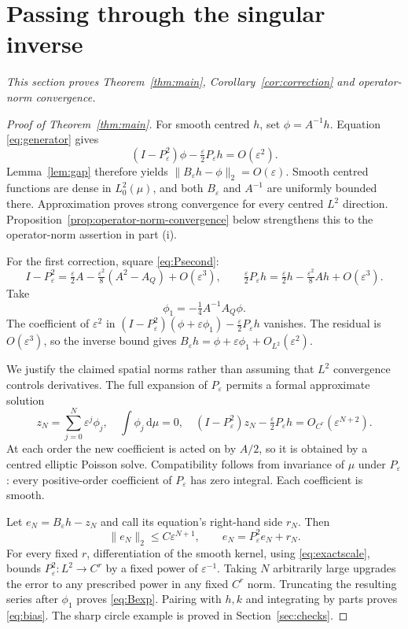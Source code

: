 \documentclass[11pt,a4paper]{article}
\theoremstyle{definition}\newtheorem{definition}[theorem]{Definition}
\theoremstyle{remark}\newtheorem{remark}[theorem]{Remark}
\newcommand{\eps}{\varepsilon}
\newcommand{\dd}{\,\mathrm d}
\newcommand{\norm}[1]{\lVert #1\rVert}
\begin{document}
\section{Passing through the singular inverse}\label{sec:inverse}

\noindent\emph{This section proves Theorem~\ref{thm:main}, Corollary~\ref{cor:correction} and operator-norm convergence.}

\begin{proof}[Proof of Theorem~\ref{thm:main}]
For smooth centred $h$, set $\phi=A^{-1}h$. Equation \eqref{eq:generator} gives
\[
(I-P_\eps^2)\phi-\tfrac\eps2P_\eps h=O(\eps^2).
\]
Lemma~\ref{lem:gap} therefore yields $\norm{B_\eps h-\phi}_2=O(\eps)$.
Smooth centred functions are dense in $L^2_0(\mu)$, and both $B_\eps$ and $A^{-1}$ are uniformly bounded there. Approximation proves strong convergence for every centred $L^2$ direction. Proposition~\ref{prop:operator-norm-convergence} below strengthens this to the operator-norm assertion in part (i).

For the first correction, square \eqref{eq:Psecond}:
\[
I-P_\eps^2=\tfrac\eps2A-\tfrac{\eps^2}{8}(A^2-A_Q)+O(\eps^3),
\qquad \tfrac\eps2P_\eps h=\tfrac\eps2h-\tfrac{\eps^2}{8}Ah+O(\eps^3).
\]
Take
\[
\phi_1=-\tfrac14A^{-1}A_Q\phi.
\]
The coefficient of $\eps^2$ in
$(I-P_\eps^2)(\phi+\eps\phi_1)-\tfrac\eps2P_\eps h$
vanishes. The residual is $O(\eps^3)$, so the inverse bound gives
$B_\eps h=\phi+\eps\phi_1+O_{L^2}(\eps^2)$.

We justify the claimed spatial norms rather than assuming that $L^2$ convergence controls derivatives. The full expansion of $P_\eps$ permits a formal approximate solution
\[
z_N=\sum_{j=0}^{N}\eps^j\phi_j,
\quad \int\phi_j\dd\mu=0,
\quad (I-P_\eps^2)z_N-\tfrac\eps2P_\eps h=O_{C^r}(\eps^{N+2}).
\]
At each order the new coefficient is acted on by $A/2$, so it is obtained by a centred elliptic Poisson solve. Compatibility follows from invariance of $\mu$ under $P_\eps$: every positive-order coefficient of $P_\eps$ has zero integral. Each coefficient is smooth.

Let $e_N=B_\eps h-z_N$ and call its equation's right-hand side $r_N$. Then
\[
\norm{e_N}_2\leq C\eps^{N+1},\qquad e_N=P_\eps^2e_N+r_N.
\]
For every fixed $r$, differentiation of the smooth kernel, using \eqref{eq:exactscale}, bounds $P_\eps^2:L^2\to C^r$ by a fixed power of $\eps^{-1}$. Taking $N$ arbitrarily large upgrades the error to any prescribed power in any fixed $C^r$ norm. Truncating the resulting series after $\phi_1$ proves \eqref{eq:Bexp}. Pairing with $h,k$ and integrating by parts proves \eqref{eq:bias}. The sharp circle example is proved in Section~\ref{sec:checks}.
\end{proof}
\end{document}
